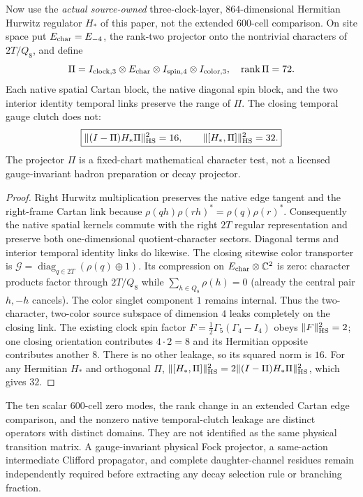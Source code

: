 \documentclass[12pt,a4paper]{article}
\begin{document}
\begin{theorem}
\label{p10:thm:v3027-native-character-clutch}
Now use the \emph{actual source-owned} three-clock-layer,
$864$-dimensional Hermitian Hurwitz regulator $H_*$ of this paper,
not the extended $600$-cell comparison. On site space put
$E_{\rm char}=E_{-4}$, the rank-two projector onto the nontrivial
characters of $2T/Q_8$, and define
\[
 \Pi=I_{\rm clock,3}\otimes E_{\rm char}
          \otimes I_{\rm spin,4}\otimes I_{\rm color,3},
 \quad \operatorname{rank}\Pi=72.
\]
Each native spatial Cartan block, the native diagonal spin block,
and the two interior identity temporal links preserve the range
of $\Pi$. The closing temporal gauge clutch does not:
\[
\boxed{\|(I-\Pi)H_*\Pi\|_{\rm HS}^2=16,
\qquad\|[H_*,\Pi]\|_{\rm HS}^2=32.}
\]
The projector $\Pi$ is a fixed-chart mathematical character test,
not a licensed gauge-invariant hadron preparation or decay projector.
\end{theorem}
\begin{proof}
Right Hurwitz multiplication preserves the native edge tangent and
the right-frame Cartan link because
$\rho(qh)\rho(rh)^*=\rho(q)\rho(r)^*$.
Consequently the native spatial kernels commute with the right
$2T$ regular representation and preserve both one-dimensional
quotient-character sectors. Diagonal terms and interior temporal
identity links do likewise. The closing sitewise color transporter
is $\mathcal G=\operatorname{diag}_{q\in2T}(\rho(q)\oplus1)$.
Its compression on $E_{\rm char}\otimes\mathbb C^2$ is zero:
character products factor through $2T/Q_8$ while
$\sum_{h\in Q_8}\rho(h)=0$ (already the central pair
$h,-h$ cancels). The color singlet component $1$ remains internal.
Thus the two-character, two-color source subspace of dimension $4$
leaks completely on the closing link. The existing clock spin factor
$F=\frac12\Gamma_5(\Gamma_4-I_4)$ obeys
$\|F\|_{\rm HS}^2=2$; one closing orientation contributes $4\cdot2=8$
and its Hermitian opposite contributes another $8$.
There is no other leakage, so its squared norm is $16$.
For any Hermitian $H_*$ and orthogonal $\Pi$,
$\|[H_*,\Pi]\|_{\rm HS}^2=2\|(I-\Pi)H_*\Pi\|_{\rm HS}^2$,
which gives $32$.
\end{proof}

\begin{remark}
\label{p10:rem:v3027-character-leakage-firewall}
The ten scalar $600$-cell zero modes, the rank change in an extended
Cartan edge comparison, and the nonzero native temporal-clutch leakage
are distinct operators with distinct domains. They are not identified
as the same physical transition matrix. A gauge-invariant physical
Fock projector, a same-action intermediate Clifford propagator,
and complete daughter-channel residues remain independently required
before extracting any decay selection rule or branching fraction.
\end{remark}
\end{document}
